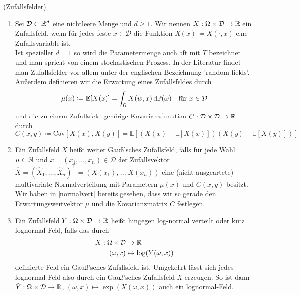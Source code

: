 \begin{Definition}(Zufallsfelder) 
	\label{randomFields}
	\begin{enumerate}[label=(\alph*)]
		\item Sei $ \mathcal{D} \subset \mathbb{R}^d  $ eine nichtleere Menge und $ d \geq 1$. Wir nennen $ X : \Omega \times \mathcal{D} \to \mathbb{R}$ ein Zufallsfeld, wenn für jedes feste $ x \in \mathcal{D} $ die Funktion $ X(x) \coloneqq X(\cdot,x) $ eine Zufallsvariable ist. \\
		Ist spezieller $ d=1 $ so wird die Parametermenge auch oft mit $ T $ bezeichnet und man spricht von einem stochastischen Prozess.
		In der Literatur findet man Zufallsfelder vor allem unter der englischen Bezeichnung 'random fields'. \\
		Außerdem definieren wir die Erwartung eines Zufallsfeldes durch
		\[
			\mu(x) \coloneqq \mathbb{E}[X(x)] = \int_{\Omega} X(w,x) \, \mathrm{d} \mathbb{P}(\omega)  \quad \text{für } x \in \mathcal{D}
		\]
		und die zu einem Zufallsfeld gehörige Kovarianzfunktion $ C: \mathcal{D} \times \mathcal{D} \to \mathbb{R} $ durch 
		\[
			C(x,y) \coloneqq \text{Cov}[X(x),X(y)] = \mathbb{E}\left[ \left(X(x)-\mathbb{E}[X(x)] \right) \left(X(y)-\mathbb{E}[X(y)]\right) \right]
		\]
		\item Ein Zufallsfeld $ X $ heißt weiter Gauß'sches Zufallsfeld, falls für jede Wahl $ n \in \mathbb{N} $ und $ x = (x_1,\dots,x_n) \in \mathcal{D}$
		der Zufallsvektor $ \hat{X} = (\hat{X}_1,\dots,\hat{X}_n)^{\top} = (X(x_1),\dots,X(x_n)) $ eine (nicht ausgeartete) multivariate Normalverteilung mit Parametern $ \mu(x) $ und $ C(x,y) $ besitzt.
		Wir haben in \ref{normalvert} bereits gesehen, dass wir so gerade den Erwartungswertvektor $ \mu $ und die Kovarianzmatrix $ C $ festlegen.
		\item Ein Zufallsfeld $ Y: \Omega \times \mathcal{D} \to \mathbb{R} $ heißt hingegen log-normal verteilt oder kurz lognormal-Feld,
		falls das durch 
		\begin{align*}
			X: \Omega \times \mathcal{D} &\to \mathbb{R}  \\ (\omega,x) &\mapsto \log(Y(\omega,x)) 
		\end{align*}
		 definierte Feld ein Gauß'sches Zufallsfeld ist.
		 Umgekehrt lässt sich jedes lognormal-Feld also durch ein Gauß'sches Zufallsfeld $ X  $ erzeugen. So ist dann $ \tilde{Y}:\Omega \times \mathcal{D} \to \mathbb{R} $, $  (\omega,x) \mapsto \exp(X(\omega,x)) $ auch ein lognormal-Feld.
		
	\end{enumerate}
\end{Definition}


